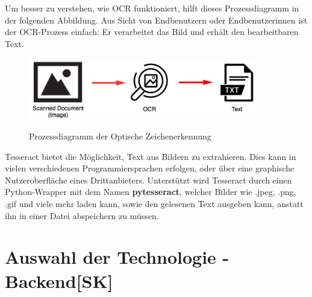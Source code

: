 Um besser zu verstehen, wie OCR funktioniert, hilft dieses Prozessdiagramm in der folgenden Abbildung. Aus Sicht von Endbenutzern oder Endbenutzerinnen ist der OCR-Prozess einfach: Er verarbeitet das Bild und erhält den bearbeitbaren Text.
\begin{figure}[H]
  \centering
  \includegraphics[width=10cm]{pics/OCR-Prozessdiagramm.png}
  \caption{Prozessdiagramm der Optische Zeichenerkennung}
  \cite{introToTesseract}
\end{figure}
 Tesseract bietet die Möglichkeit, Text aus Bildern zu extrahieren. Dies kann in vielen verschiedenen Programmiersprachen erfolgen, oder über eine graphische Nutzeroberfläche eines Drittanbieters.\cite{AboutTesseract} Unterstützt wird Tesseract durch einen Python-Wrapper mit dem Namen \textbf{pytesseract}, welcher Bilder wie .jpeg, .png, .gif und viele mehr laden kann, sowie den gelesenen Text ausgeben kann, anstatt ihn in einer Datei abspeichern zu müssen.\cite{AboutPyTesseract}
 
\section{Auswahl der Technologie - Backend[SK]}

